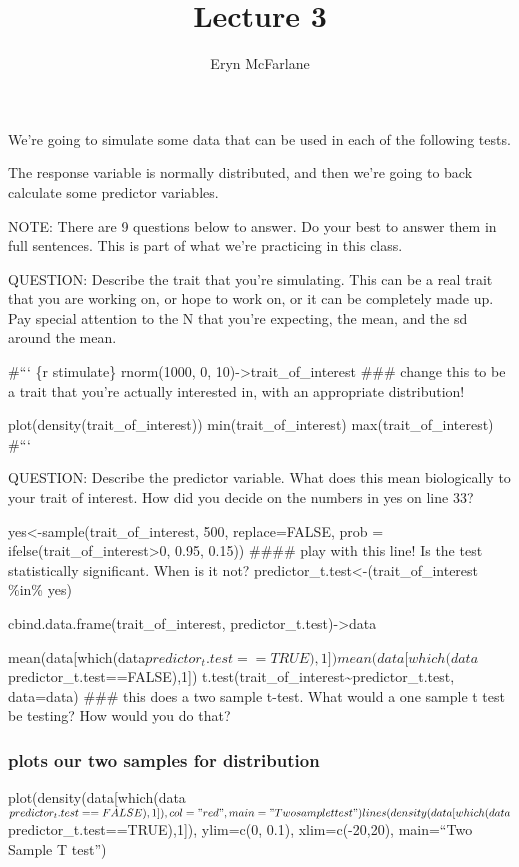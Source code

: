 \documentclass[
]{article}
\title{Lecture 3}
\author{Eryn McFarlane}
\date{}
\begin{document}
\maketitle

We're going to simulate some data that can be used in each of the
following tests.

The response variable is normally distributed, and then we're going to
back calculate some predictor variables.

NOTE: There are 9 questions below to answer. Do your best to answer them
in full sentences. This is part of what we're practicing in this class.

QUESTION: Describe the trait that you're simulating. This can be a real
trait that you are working on, or hope to work on, or it can be
completely made up. Pay special attention to the N that you're
expecting, the mean, and the sd around the mean.

\#``` \{r stimulate\} rnorm(1000, 0,
10)-\textgreater trait\_of\_interest \#\#\# change this to be a trait
that you're actually interested in, with an appropriate distribution!

plot(density(trait\_of\_interest)) min(trait\_of\_interest)
max(trait\_of\_interest) \#```

QUESTION: Describe the predictor variable. What does this mean
biologically to your trait of interest. How did you decide on the
numbers in yes on line 33?

yes\textless-sample(trait\_of\_interest, 500, replace=FALSE, prob =
ifelse(trait\_of\_interest\textgreater0, 0.95, 0.15)) \#\#\#\# play with
this line! Is the test statistically significant. When is it not?
predictor\_t.test\textless-(trait\_of\_interest \%in\% yes)

cbind.data.frame(trait\_of\_interest,
predictor\_t.test)-\textgreater data

mean(data{[}which(data\(predictor_t.test==TRUE),1])
mean(data[which(data\)predictor\_t.test==FALSE),1{]})
t.test(trait\_of\_interest\textasciitilde predictor\_t.test, data=data)
\#\#\# this does a two sample t-test. What would a one sample t test be
testing? How would you do that?

\subsubsection{plots our two samples for
distribution}\label{plots-our-two-samples-for-distribution}

plot(density(data{[}which(data\(predictor_t.test==FALSE),1]), col="red", main="Two sample t test")
lines(density(data[which(data\)predictor\_t.test==TRUE),1{]}), ylim=c(0,
0.1), xlim=c(-20,20), main=``Two Sample T test'')
\end{document}
